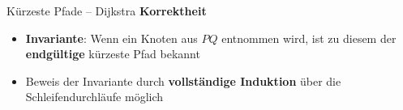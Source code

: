 \begin{frame}{Kürzeste Pfade – Dijkstra}
	\textbf{Korrektheit}
	\begin{itemize}
		\item \textbf{Invariante}: Wenn ein Knoten aus $PQ$ entnommen wird, ist zu diesem der \textbf{endgültige} kürzeste Pfad bekannt
		\pause
		\item Beweis der Invariante durch \textbf{vollständige Induktion} über die Schleifendurchläufe möglich
	\end{itemize}
\end{frame}

\iffalse

\mycomment{

	\begin{frame}{Kürzeste Pfade – Dijkstra}
		\textbf{Korrektheitsbeweis} \\
		\underline{IA.:} Endgültiger kürzester Pfad zu $s$: Trivial \yop \\[0,125cm]
		\pause
		\underline{IV.:} Zu allen Knoten $v_1, ..., v_{i-1}$, die aus der $PQ$ entnommen wurden, \\
		\quad\ \ ist der \textbf{endgültige} kürzeste Pfad bekannt \\[0,125cm]
		\pause
		\underline{IS.:} Knoten $v_i$ wird entnommen. Der bekannte kürzeste Pfad führt \\
		\quad\ \ „irgendwie“ über $v_1 ... v_{i-1}$ zu $v_i$. \\
		\pause
		\quad\ \ Ang., es gibt einen \textbf{echt} kürzeren Pfad zu $v_i$. Dieser \textbf{muss} dann über \\
		\quad\ \ einen Knoten $p$ aus der $PQ$ zu $v_i$ führen. \\
		\pause
		\quad\ \ Dafür gibt es zwei Möglichkeiten: \\
		\pause
		\quad\ \ Fall 1: Zu $p$ gibt es einen kürzeren Pfad als zu $v_i$ \\
		\pause
		\qquad\qquad\ \ \impl $p$ wurde \textbf{vor} $v_i$ aus der $PQ$ entnommen \crash \\
		\pause
		\quad\ \ Fall 2: Der Pfad über $p$ zu $v_i$ ist kürzer als der kürzeste Pfad zu $p$ \\
		\pause
		\qquad\qquad\ \ \impl $c((p, v_i)) < 0$ \crash { \small(Keine negativen Kantengewichte erlaubt!)}
	\end{frame}
}

\fi

